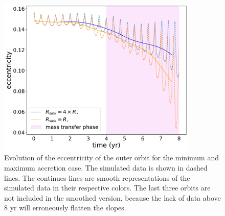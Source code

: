 \begin{figure}[!htb]
\vspace{-1cm}
    \centering
    \includegraphics[width=0.85\textwidth]{Thesis/graphs/accretion_case/accretion_outer_ecc.pdf}
    \caption{Evolution of the eccentricity of the outer orbit for the minimum and maximum accretion case. The simulated data is shown in dashed lines. The continues lines are smooth representations of the simulated data in their respective colors. The last three orbits are not included in the smoothed version, because the lack of data above $8$ yr will erroneously flatten the slopes.}
    \label{fig:accretion_outer_ecc}
\end{figure}

